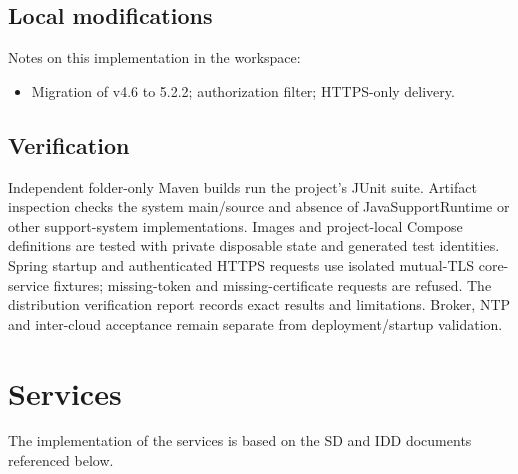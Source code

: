 \documentclass[a4paper]{arrowhead}
\begin{document}
\subsection{Local modifications}
\label{sec:local}

Notes on this implementation in the workspace:
\begin{itemize}
  \item Migration of v4.6 to 5.2.2; authorization filter; HTTPS-only delivery.
\end{itemize}

\subsection{Verification}

Independent folder-only Maven builds run the project's JUnit suite. Artifact inspection checks the system main/source and absence of JavaSupportRuntime or other support-system implementations. Images and project-local Compose definitions are tested with private disposable state and generated test identities. Spring startup and authenticated HTTPS requests use isolated mutual-TLS core-service fixtures; missing-token and missing-certificate requests are refused. The distribution verification report records exact results and limitations. Broker, NTP and inter-cloud acceptance remain separate from deployment/startup validation.

\newpage

\section{Services}
\label{sec:services}

The implementation of the services is based on the SD and IDD documents referenced below.
\end{document}
